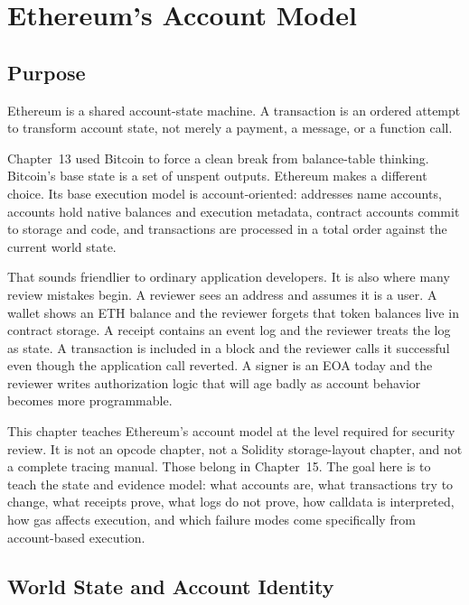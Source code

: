 \chapter{Ethereum's Account Model}

\section{Purpose}

\begin{principlebox}
Ethereum is a shared account-state machine. A transaction is an ordered attempt to transform account state, not merely a payment, a message, or a function call.
\end{principlebox}

Chapter~13 used Bitcoin to force a clean break from balance-table thinking. Bitcoin's base state is a set of unspent outputs. Ethereum makes a different choice. Its base execution model is account-oriented: addresses name accounts, accounts hold native balances and execution metadata, contract accounts commit to storage and code, and transactions are processed in a total order against the current world state.

That sounds friendlier to ordinary application developers. It is also where many review mistakes begin. A reviewer sees an address and assumes it is a user. A wallet shows an ETH balance and the reviewer forgets that token balances live in contract storage. A receipt contains an event log and the reviewer treats the log as state. A transaction is included in a block and the reviewer calls it successful even though the application call reverted. A signer is an EOA today and the reviewer writes authorization logic that will age badly as account behavior becomes more programmable.

This chapter teaches Ethereum's account model at the level required for security review. It is not an opcode chapter, not a Solidity storage-layout chapter, and not a complete tracing manual. Those belong in Chapter~15. The goal here is to teach the state and evidence model: what accounts are, what transactions try to change, what receipts prove, what logs do not prove, how calldata is interpreted, how gas affects execution, and which failure modes come specifically from account-based execution.

\section{World State and Account Identity}

